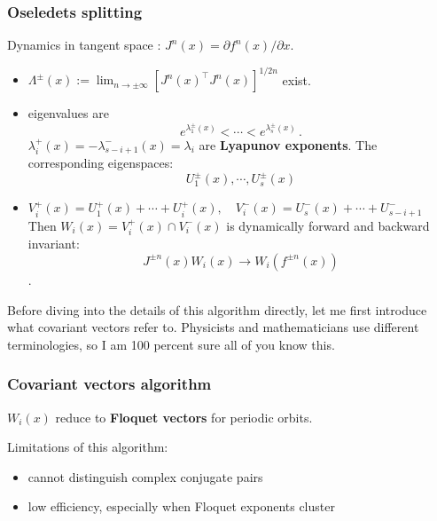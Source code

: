 \documentclass[mathserif, handout]{beamer}
\begin{document}
\begin{frame}
  \frametitle{Oseledets splitting~\cite{ruelle79}}
  Dynamics in tangent space : $J^n(x)=\partial f^n(x)/\partial x$.
  \begin{itemize}
  \item $\Lambda^{\pm}(x) :=\lim_{n\to\pm\infty}[J^n(x)^\top J^{n}(x)]^{1/2n}$
    exist.

  \item eigenvalues are
    \[
    e^{\lambda^{\pm}_1(x)}<\cdots<e^{\lambda^{\pm}_s(x)}
    \,.
    \]
    $\lambda^{+}_i(x)=-\lambda^{-}_{s-i+1}(x)=\lambda_i$ are
    \textbf{Lyapunov exponents}.
    The corresponding eigenspaces:
    \[U^\pm_1(x), \cdots, U^\pm_s(x)\]

    \pause
  \item
    $
    V^+_i(x)=U^+_1(x)+\cdots+U^+_i(x),\quad
    V^-_i(x)=U^-_s(x)+\cdots+U^-_{s-i+1}
    $
    Then
    {\color{green} $W_i(x)=V^+_i(x)\cap V^-_i(x)$} is
    dynamically {\color{red} forward}
    and {\color{red} backward} invariant:
    {\color{green}
      \[J^{\pm n}(x)W_i(x) \to W_i(f^{\pm n}(x))\].
    }
  \end{itemize}

   {
    Before diving into the details of this algorithm directly,
    let me first introduce what covariant vectors refer to.  Physicists
    and mathematicians use different terminologies, so I am 100 percent
    sure all of you know this.
  }

\end{frame}



\begin{frame}
  \frametitle{Covariant vectors algorithm~\cite{GiChLiPo12}}

  

  $W_i(x)$ reduce to \textbf{Floquet vectors} for periodic orbits.


  \pause

  {\color{green} Limitations of this algorithm:}
  \begin{itemize}
  \item cannot distinguish complex conjugate pairs
  \item low efficiency, especially when Floquet exponents cluster
  \end{itemize}



\end{frame}
\end{document}
